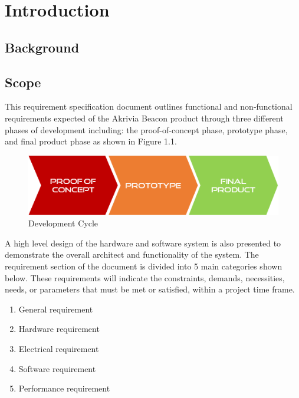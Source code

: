 %




\setcounter{section}{0}
\section{Introduction}
\bigskip
\subsection{Background}
\break



\subsection{Scope}
This requirement specification document outlines functional and non-functional requirements expected of the Akrivia Beacon product through three different phases of development including: the proof-of-concept phase, prototype phase, and final product phase as shown in Figure 1.1. 
\medskip

\begin{figure}[H]
\centering
    \includegraphics[scale=0.4]{./images/dev-path.png}
    \caption{Development Cycle}
\end{figure}

A high level design of the hardware and software system is also presented to demonstrate the overall architect and functionality of the system. The requirement section of the document is divided into 5 main categories shown below. These requirements will indicate the constraints, demands, necessities, needs, or parameters that must be met or satisfied, within a project time frame.

\begin{enumerate}
	\item General requirement 
	\item Hardware requirement 
	\item Electrical requirement 
	\item Software requirement 
	\item Performance requirement 
\end{enumerate}
\medskip

